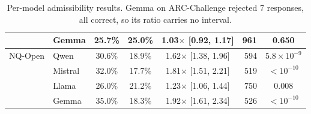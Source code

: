 \begin{table}[h]
\begin{tabular}{llcccrc}
 & Gemma & 25.7\% & 25.0\% & 1.03$\times$ [0.92, 1.17] & 961 & 0.650 \\
\midrule
NQ-Open & Qwen & 30.6\% & 18.9\% & 1.62$\times$ [1.38, 1.96] & 594 & $5.8\times 10^{-9}$ \\
 & Mistral & 32.0\% & 17.7\% & 1.81$\times$ [1.51, 2.21] & 519 & $<10^{-10}$ \\
 & Llama & 26.0\% & 21.2\% & 1.23$\times$ [1.06, 1.44] & 750 & 0.008 \\
 & Gemma & 35.0\% & 18.3\% & 1.92$\times$ [1.61, 2.34] & 526 & $<10^{-10}$ \\
\bottomrule
\end{tabular}
\caption{Per-model admissibility results. Gemma on ARC-Challenge rejected 7 responses, all correct, so its ratio carries no interval.}
\label{tab:pred3-permodel}
\end{table}
